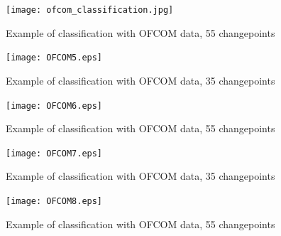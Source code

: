 \begin{figure}[h]
\centering
\texttt{[image: ofcom\_classification.jpg]}
\caption{Example of classification with OFCOM data, 55 changepoints}
\label{fig:hvb}
\end{figure}

\begin{figure}[h]
\centering
\texttt{[image: OFCOM5.eps]}
\caption{Example of classification with OFCOM data, 35 changepoints}
\label{fig:hvb}
\end{figure}

\begin{figure}[h]
\centering
\texttt{[image: OFCOM6.eps]}
\caption{Example of classification with OFCOM data, 55 changepoints}
\label{fig:hvb}
\end{figure}

\begin{figure}[h]
\centering
\texttt{[image: OFCOM7.eps]}
\caption{Example of classification with OFCOM data, 35 changepoints}
\label{fig:hvb}
\end{figure}

\begin{figure}[h]
\centering
\texttt{[image: OFCOM8.eps]}
\caption{Example of classification with OFCOM data, 55 changepoints}
\label{fig:hvb}
\end{figure}
